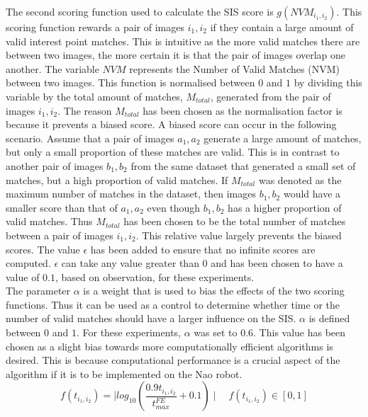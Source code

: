 The second scoring function used to calculate the SIS score is $g(NVM_{i_1, i_2})$. This scoring function rewards a pair of images $i_1, i_2$ if they contain a large amount of valid interest point matches. This is intuitive as the more valid matches there are between two images, the more certain it is that the pair of images overlap one another. The variable $NVM$ represents the Number of Valid Matches (NVM) between two images. This function is normalised between $0$ and  $1$ by dividing this variable by the total amount of matches, $M_{total}$, generated from the pair of images $i_1, i_2$. The reason $M_{total}$ has been chosen as the normalisation factor is because it prevents a biased score. A biased score can occur in the following scenario. Assume that a pair of images $a_1, a_2$ generate a large amount of matches, but only a small proportion of these matches are valid. This is in contrast to another pair of images $b_1, b_2$ from the same dataset that generated a small set of matches, but a high proportion of valid matches. If $M_{total}$ was denoted as the maximum number of matches in the dataset, then images $b_1, b_2$ would have a smaller score than that of $a_1, a_2$ even though $b_1, b_2$ has a higher proportion of valid matches. Thus $M_{total}$ has been chosen to be the total number of matches between a pair of images $i_1, i_2$. This relative value largely prevents the biased scores. The value $\epsilon$ has been added to ensure that no infinite scores are computed. $\epsilon$ can take any value greater than $0$ and has been chosen to have a value of $0.1$, based on observation, for these experiments.\\ 

The parameter $\alpha$ is a weight that is used to bias the effects of the two scoring functions. Thus it can be used as a control to determine whether time or the number of valid matches should have a larger influence on the SIS. $\alpha$ is defined between $0$ and $1$. For these experiments, $\alpha$ was set to $0.6$. This value has been chosen as a slight bias towards more computationally efficient algorithms is desired. This is because computational performance is a crucial aspect of the algorithm if it is to be implemented on the Nao robot.\\

\begin{equation}
f(t_{i_1, i_2}) = \mid log_{10}(\frac{0.9 t_{i_1, i_2}}{t_{max}^{FE}} + 0.1) \mid \quad f(t_{i_1, i_2})\in [0, 1]
\label{eqn:time}
\end{equation}

